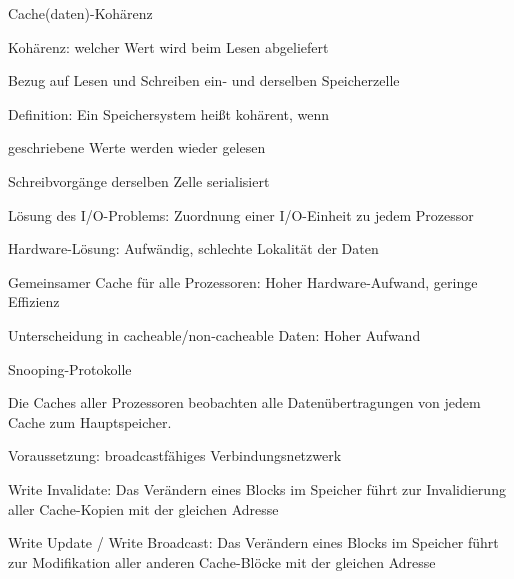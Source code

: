 \documentclass[10pt,landscape]{article}
\begin{document}
\begin{multicols}{3}
  
  
  
  
  Cache(daten)-Kohärenz
  \begin{itemize*}
    \item Kohärenz: welcher Wert wird beim Lesen abgeliefert
    \item Bezug auf Lesen und Schreiben ein- und derselben Speicherzelle
    \item Definition: Ein Speichersystem heißt kohärent, wenn
    \begin{itemize*}
      \item geschriebene Werte werden wieder gelesen
      \item Schreibvorgänge derselben Zelle serialisiert
    \end{itemize*}
    \item Lösung des I/O-Problems: Zuordnung einer I/O-Einheit zu jedem Prozessor
    \item Hardware-Lösung: Aufwändig, schlechte Lokalität der Daten
    \item Gemeinsamer Cache für alle Prozessoren: Hoher Hardware-Aufwand, geringe Effizienz
    \item Unterscheidung in cacheable/non-cacheable Daten: Hoher Aufwand
  \end{itemize*}
  
  Snooping-Protokolle
  \begin{itemize*}
    \item Die Caches aller Prozessoren beobachten alle Datenübertragungen von jedem Cache zum Hauptspeicher.
    \item Voraussetzung: broadcastfähiges Verbindungsnetzwerk
    \item Write Invalidate: Das Verändern eines Blocks im Speicher führt zur Invalidierung aller Cache-Kopien mit der gleichen Adresse
    \item Write Update / Write Broadcast: Das Verändern eines Blocks im Speicher führt zur Modifikation aller anderen Cache-Blöcke mit der gleichen Adresse
  \end{itemize*}
  

\end{multicols}
\end{document}
